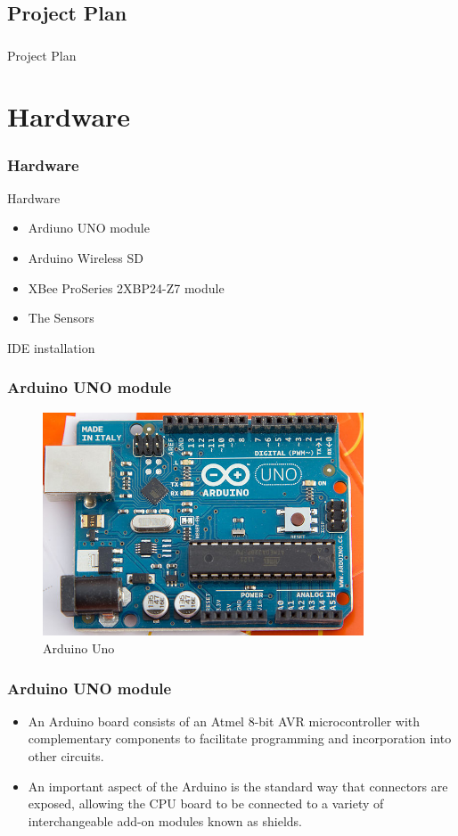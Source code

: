 \documentclass{beamer}
\begin{document}
\subsection{Project Plan}
\frame
{
	\frametitle{}
	\begin{center}
	Project Plan	
	\end{center}
}

\section{Hardware}
\frame
{
	\frametitle{Hardware}
	Hardware
	\begin{itemize}
	\item Ardiuno UNO module
 	\item Arduino Wireless SD
	\item XBee ProSeries 2XBP24-Z7 module
	\item The Sensors
	\end{itemize}
	IDE installation	
}

\frame
{
	\frametitle{Arduino UNO module}
	\begin{figure}[h!]
  		\centering
    	\includegraphics[width=0.85\textwidth]{../Images/Arduino_Uno.png}
		\caption{Arduino Uno}
	\end{figure}
}

\frame
{
	\frametitle{Arduino UNO module}
	\begin{itemize}
	\item An Arduino board consists of an Atmel 8-bit AVR microcontroller with complementary components to facilitate programming and incorporation into other circuits.
	\item An important aspect of the Arduino is the standard way that connectors are exposed, allowing the CPU board to be connected to a variety of interchangeable add-on modules known as shields. 
	\end{itemize}
}
\end{document}
